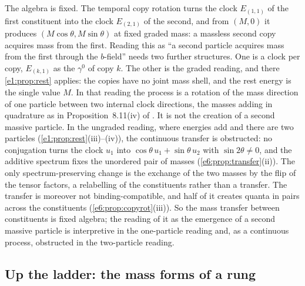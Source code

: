 \begin{remark}
\label{e6:rem:transfer}
The algebra is fixed. The temporal copy rotation turns the clock $E_{(1,1)}$ of the first constituent into the clock $E_{(2,1)}$ of the second, and
from $(M,0)$ it produces $(M\cos\theta,M\sin\theta)$ at fixed graded mass: a massless second copy acquires mass from the first. Reading this as ``a
second particle acquires mass from the first through the $b$-field'' needs two further structures. One is a clock per copy, $E_{(k,1)}$ as the
$\gamma^0$ of copy $k$. The other is the graded reading, and there \cref{e1:prop:rest} applies: the copies have no joint mass shell, and the rest energy is
the single value $M$. In that reading the process is a rotation of the mass direction of one particle between two internal clock directions,
the masses adding in quadrature as in Proposition~8.11(iv) of \cite{RE}. It is not the creation of a second massive particle. In the ungraded
reading, where energies add and there are two particles (\cref{e1:prop:rest}(iii)--(iv)), the continuous transfer is obstructed: no conjugation turns
the clock $u_1$ into $\cos\theta\,u_1+\sin\theta\,u_2$ with $\sin2\theta\neq0$, and the additive spectrum fixes the unordered pair of masses
(\cref{e6:prop:transfer}(ii)). The only spectrum-preserving change is the exchange of the two masses by the flip of the tensor factors, a
relabelling of the constituents rather than a transfer. The transfer is moreover not
binding-compatible, and half of it creates quanta in pairs across the constituents (\cref{e6:prop:copyrot}(iii)). So the mass transfer between
constituents is fixed algebra; the reading of it as the emergence of a second massive particle is interpretive in the one-particle reading and,
as a continuous process, obstructed in the two-particle reading.
\end{remark}

\subsection{Up the ladder: the mass forms of a rung}
\label{e6:sec:ladder}

